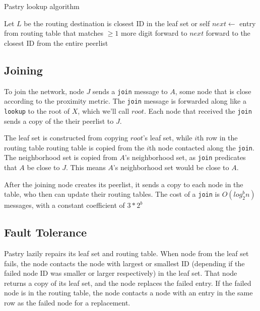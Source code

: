 \begin{algorithm}
    \caption{Pastry lookup algorithm}
    \label{PastryLookup}
    \begin{algorithmic}
        \State Let $L$ be the routing  
            	\State destination is closest ID in the leaf set or self
            \Else
            	\State $next\gets$ entry from routing table that matches $\geq 1$ more digit
                	\State forward to $next$
            	\Else
                	\State forward to the closest ID from the entire peerlist
                \EndIf
                
            \EndIf
        \EndFunction
    \end{algorithmic}
\end{algorithm}

\subsection*{Joining}
To join the network, node $J$ sends a \texttt{join} message to $A$, some node that is close according to the proximity metric.
The \texttt{join} message is forwarded along like a \texttt{lookup} to the root of $X$, which we'll call $root$.
Each node that received the \texttt{join} sends a copy of the their peerlist to $J$.

The leaf set is constructed from copying $root$'s leaf set, while $i$th row in the routing table routing table is copied from the $i$th node contacted along the \texttt{join}.
The neighborhood set is copied from $A$'s neighborhood set, as \texttt{join} predicates that $A$ be close to $J$.
This means $A$'s neighborhood set would be close to $A$. 

After the joining node creates its peerlist, it sends a copy to each node in the table, who then can update their routing tables.  
The cost of a \texttt{join} is $O(log_{2}^{b} n)$ messages,  with  a constant  coefficient  of $3*2^{b}$




\subsection*{Fault Tolerance}
Pastry lazily repairs its leaf set and routing table.
When node from the leaf set fails, the node contacts the node with largest or smallest ID (depending if the failed node ID was smaller or larger respectively) in the leaf set.
That node returns a copy of its leaf set, and the node replaces the failed entry.
If the failed node is in the routing table, the node contacts a node with an entry in the same row as the failed node for a replacement.

